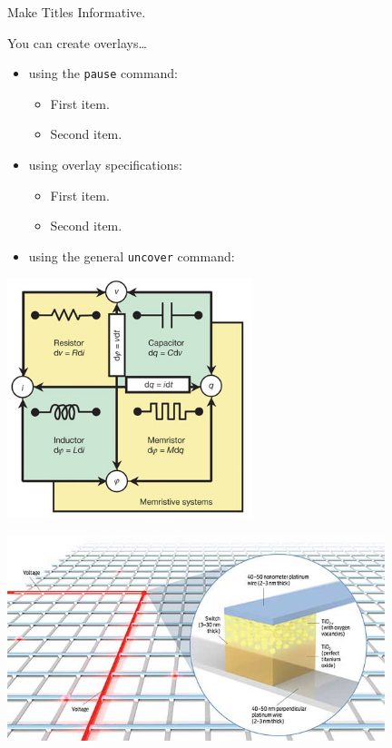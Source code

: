 \documentclass{beamer}
\begin{document}
\begin{frame}{Make Titles Informative.}

  You can create overlays\dots
  \begin{itemize}
  \item using the \texttt{pause} command:
    \begin{itemize}
    \item
      First item.
      \pause
    \item
      Second item.
    \end{itemize}
  \item
    using overlay specifications:
    \begin{itemize}
    \item<3->
      First item.
    \item<4->
      Second item.
    \end{itemize}
  \item
    using the general \texttt{uncover} command:
    \begin{itemize}
    \end{itemize}
  \end{itemize}
\end{frame}

\begin{frame}
  \center
  \includegraphics[height=7cm]{memristor02.jpg}
\end{frame}

\begin{frame}
  \includegraphics[height=6cm]{memristor01.jpg}
\end{frame}
\end{document}
